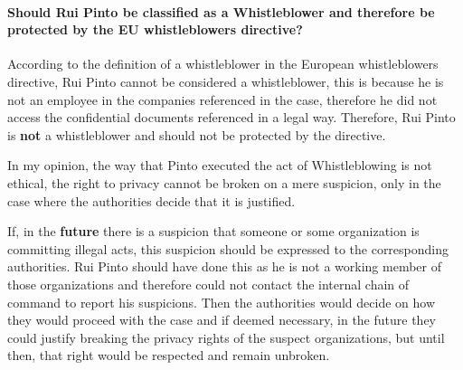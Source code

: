     \paragraph{Should Rui Pinto be classified as a Whistleblower and therefore be protected by the EU whistleblowers directive?}
    According to the definition of a whistleblower in the European whistleblowers directive, Rui Pinto cannot be considered a whistleblower, this is because he is not an employee in the companies referenced in the case, therefore he did not access the confidential documents referenced in a legal way.
    Therefore, Rui Pinto is \textbf{not} a whistleblower and should not be protected by the directive.

    In my opinion, the way that Pinto executed the act of Whistleblowing is not ethical, the right to privacy cannot be broken on a mere suspicion, only in the case where the authorities decide that it is justified.


    If, in the \textbf{future} there is a suspicion that someone or some organization is committing illegal acts, this suspicion should be expressed to the corresponding authorities.
    Rui Pinto should have done this as he is not a working member of those organizations and therefore could not contact the internal chain of command to report his suspicions.
    Then the authorities would decide on how they would proceed with the case and if deemed necessary, in the future they could justify breaking the privacy rights of the suspect organizations, but until then, that right would be respected and remain unbroken.


